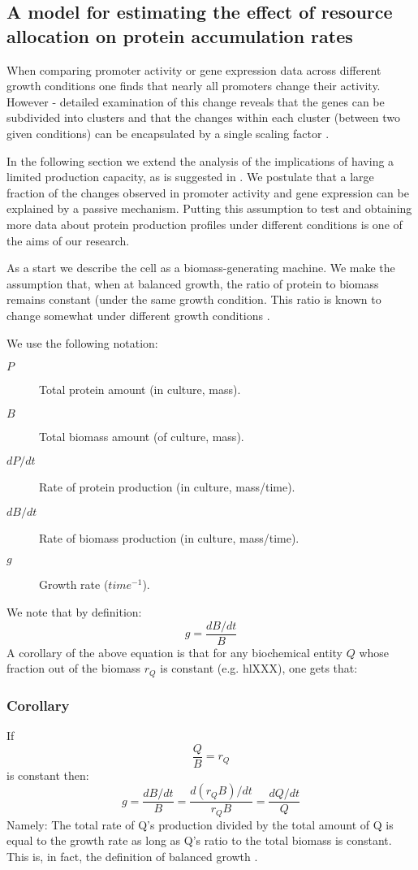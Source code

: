 \documentclass{report}
\begin{document}
\subsection{A model for estimating the effect of resource allocation on protein accumulation rates}
When comparing promoter activity or gene expression data across different growth conditions one finds that nearly all promoters change their activity.
However - detailed examination of this change reveals that the genes can be subdivided into clusters and that the changes within each cluster (between two given conditions) can be encapsulated by a single scaling factor \cite{Leeat2013}.

In the following section we extend the analysis of the implications of having a limited production capacity, as is suggested in \cite{Leeat2013}.
We postulate that a large fraction of the changes observed in promoter activity and gene expression can be explained by a passive mechanism.
Putting this assumption to test and obtaining more data about protein production profiles under different conditions is one of the aims of our research.

As a start we describe the cell as a biomass-generating machine.
We make the assumption that, when at balanced growth, the ratio of protein to biomass remains constant (under the same growth condition.
This ratio is known to change somewhat under different growth conditions \cite{Bremer1987}.

We use the following notation:
\begin{description}
\item[$P$] Total protein amount (in culture, mass).
\item[$B$] Total biomass amount (of culture, mass).
\item [$dP/dt$] Rate of protein production (in culture, mass/time).
\item [$dB/dt$] Rate of biomass production (in culture, mass/time).
\item [$g$] Growth rate ($time^{-1}$).
\end{description}
We note that by definition:
\[ g=\frac{dB/dt}{B}\]
A corollary of the above equation is that for any biochemical entity $Q$ whose fraction out of the biomass $r_Q$ is constant (e.g. hl{XXX}), one gets that:
\subsubsection{Corollary}
If
\[\frac{Q}{B}=r_Q\]
is constant then:
\begin{equation}
\label{global-gr}
g=\frac{dB/dt}{B}=\frac{d(r_QB)/dt}{r_QB}=\frac{dQ/dt}{Q}
\end{equation}
Namely: The total rate of Q’s production divided by the total amount of Q is equal to the growth rate as long as Q’s ratio to the total biomass is constant.
This is, in fact, the definition of balanced growth \cite{Campbell1957}.
\end{document}
